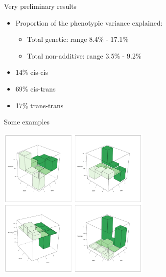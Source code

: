 \documentclass{beamer}
\begin{document}
\begin{frame}{Very preliminary results}
\begin{itemize}
\item Proportion of the phenotypic variance explained:
\begin{itemize}
\item Total genetic: range 8.4\% - 17.1\%
\item Total non-additive: range 3.5\% - 9.2\%
\end{itemize}
\item 14\% cis-cis
\item 69\% cis-trans
\item 17\% trans-trans
\end{itemize}
\end{frame}

\begin{frame}{Some examples}
\begin{center}
\includegraphics[height=7.5cm]{epistasis_examples}
\end{center}
\end{frame}
\end{document}
